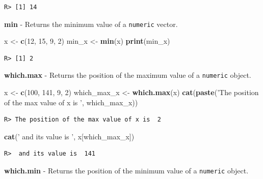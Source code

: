 \documentclass[
  12pt,
]{book}
\newenvironment{Shaded}{\begin{snugshade}}{\end{snugshade}}
\newcommand{\DecValTok}[1]{\textcolor[rgb]{0.06,0.06,0.06}{#1}}
\newcommand{\KeywordTok}[1]{\textcolor[rgb]{0.27,0.27,0.27}{\textbf{#1}}}
\newcommand{\NormalTok}[1]{#1}
\newcommand{\StringTok}[1]{\textcolor[rgb]{0.5,0.5,0.5}{#1}}
\begin{document}
\begin{verbatim}
R> [1] 14
\end{verbatim}

\textbf{min} - Returns the minimum value of a \texttt{numeric} vector. 

\begin{Shaded}
\begin{Highlighting}[]
\NormalTok{x <-}\StringTok{ }\KeywordTok{c}\NormalTok{(}\DecValTok{12}\NormalTok{, }\DecValTok{15}\NormalTok{, }\DecValTok{9}\NormalTok{, }\DecValTok{2}\NormalTok{)}
\NormalTok{min_x <-}\StringTok{ }\KeywordTok{min}\NormalTok{(x)}
\KeywordTok{print}\NormalTok{(min_x)}
\end{Highlighting}
\end{Shaded}

\begin{verbatim}
R> [1] 2
\end{verbatim}

\textbf{which.max} - Returns the position of the maximum value of a \texttt{numeric} object. 

\begin{Shaded}
\begin{Highlighting}[]
\NormalTok{x <-}\StringTok{ }\KeywordTok{c}\NormalTok{(}\DecValTok{100}\NormalTok{, }\DecValTok{141}\NormalTok{, }\DecValTok{9}\NormalTok{, }\DecValTok{2}\NormalTok{)}
\NormalTok{which_max_x <-}\StringTok{ }\KeywordTok{which.max}\NormalTok{(x)}
\KeywordTok{cat}\NormalTok{(}\KeywordTok{paste}\NormalTok{(}\StringTok{'The position of the max value of x is '}\NormalTok{, }
\NormalTok{          which_max_x))}
\end{Highlighting}
\end{Shaded}

\begin{verbatim}
R> The position of the max value of x is  2
\end{verbatim}

\begin{Shaded}
\begin{Highlighting}[]
\KeywordTok{cat}\NormalTok{(}\StringTok{' and its value is '}\NormalTok{, x[which_max_x])}
\end{Highlighting}
\end{Shaded}

\begin{verbatim}
R>  and its value is  141
\end{verbatim}

\textbf{which.min} - Returns the position of the minimum value of a \texttt{numeric} object. 
\end{document}

